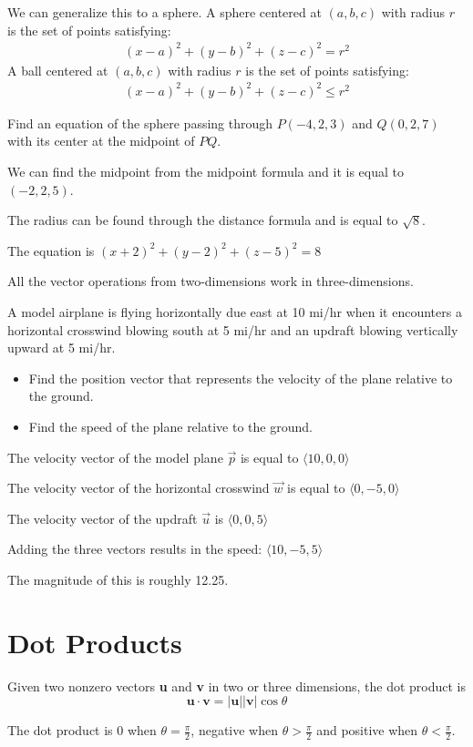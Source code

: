 \documentclass[../calc3.tex]{subfiles}
\begin{document}
We can generalize this to a sphere. A sphere centered at $(a,b,c)$ with radius $r$ is the set of points satisfying:
\begin{align*}
(x-a)^2+(y-b)^2+(z-c)^2=r^2
\end{align*}
A ball centered at $(a,b,c)$ with radius $r$ is the set of points satisfying:
\begin{align*}
(x-a)^2+(y-b)^2+(z-c)^2\leq r^2
\end{align*}
\begin{example}
Find an equation of the sphere passing through $P(-4,2,3)$ and $Q(0,2,7)$ with its center at the midpoint of $PQ$.

We can find the midpoint from the midpoint formula and it is equal to $(-2,2,5)$. 

The radius can be found through the distance formula and is equal to $\sqrt{8}$.

The equation is $(x+2)^2+(y-2)^2+(z-5)^2=8$
\end{example}
All the vector operations from two-dimensions work in three-dimensions. 
\begin{example}
A model airplane is flying horizontally due east at 10 mi/hr when it encounters a horizontal crosswind blowing south at 5 mi/hr and an updraft blowing vertically upward at 5 mi/hr. 
\begin{itemize}
    \item Find the position vector that represents the velocity of the plane relative to the ground.
    \item Find the speed of the plane relative to the ground.
\end{itemize}
The velocity vector of the model plane $\vec{p}$ is equal to $\langle 10,0,0 \rangle$

The velocity vector of the horizontal crosswind $\vec{w}$ is equal to $\langle 0,-5,0\rangle$

The velocity vector of the updraft $\vec{u}$ is $\langle 0,0,5\rangle$

Adding the three vectors results in the speed: $\langle 10,-5,5\rangle$

The magnitude of this is roughly 12.25.
\end{example}
\section{Dot Products}
\begin{definition}
    Given two nonzero vectors \textbf{u} and \textbf{v} in two or three dimensions, the dot product is
    \[\textbf{u}\cdot\textbf{v}=|\textbf{u}||\textbf{v}|\cos \theta\]
\end{definition}
The dot product is 0 when $\theta=\frac{\pi}{2}$, negative when $\theta>\frac{\pi}{2}$ and positive when $\theta<\frac{\pi}{2}$.
\end{document}
